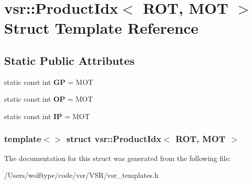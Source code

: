 \hypertarget{structvsr_1_1_product_idx_3_01_r_o_t_00_01_m_o_t_01_4}{\section{vsr\-:\-:Product\-Idx$<$ R\-O\-T, M\-O\-T $>$ Struct Template Reference}
\label{structvsr_1_1_product_idx_3_01_r_o_t_00_01_m_o_t_01_4}
}
\subsection*{Static Public Attributes}
\begin{DoxyCompactItemize}
\item 
\hypertarget{structvsr_1_1_product_idx_3_01_r_o_t_00_01_m_o_t_01_4_ab1dcbf63eec8c2220ac2261830ff6595}{static const int {\bfseries G\-P} = M\-O\-T}\label{structvsr_1_1_product_idx_3_01_r_o_t_00_01_m_o_t_01_4_ab1dcbf63eec8c2220ac2261830ff6595}

\item 
\hypertarget{structvsr_1_1_product_idx_3_01_r_o_t_00_01_m_o_t_01_4_a307b60be1333a852b4941cd59d854031}{static const int {\bfseries O\-P} = M\-O\-T}\label{structvsr_1_1_product_idx_3_01_r_o_t_00_01_m_o_t_01_4_a307b60be1333a852b4941cd59d854031}

\item 
\hypertarget{structvsr_1_1_product_idx_3_01_r_o_t_00_01_m_o_t_01_4_ac1eeeaa6d36ed39dcff1107578605aa7}{static const int {\bfseries I\-P} = M\-O\-T}\label{structvsr_1_1_product_idx_3_01_r_o_t_00_01_m_o_t_01_4_ac1eeeaa6d36ed39dcff1107578605aa7}

\end{DoxyCompactItemize}
\subsubsection*{template$<$$>$ struct vsr\-::\-Product\-Idx$<$ R\-O\-T, M\-O\-T $>$}



The documentation for this struct was generated from the following file\-:\begin{DoxyCompactItemize}
\item 
/\-Users/wolftype/code/vsr/\-V\-S\-R/vsr\-\_\-templates.\-h\end{DoxyCompactItemize}
